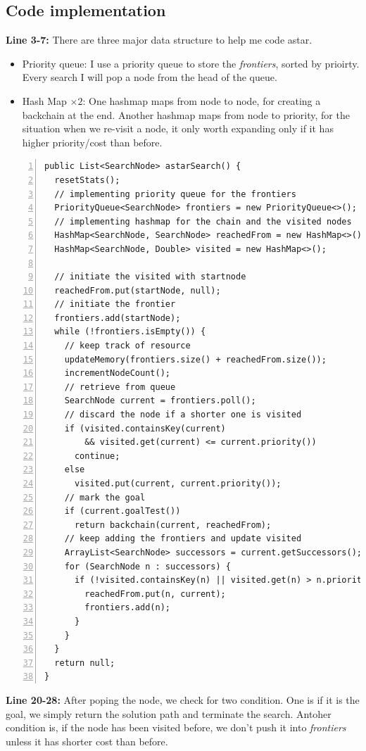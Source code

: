 \subsection{Code implementation}
\textbf{Line 3-7:} There are three major data structure to help me code astar.
\begin{itemize}
\item Priority queue: I use a priority queue to store the \emph{frontiers}, sorted by prioirty. Every search I will pop a node from the head of the queue.
\item Hash Map $\times 2$: One hashmap maps from node to node, for creating a backchain at the end. Another hashmap maps from node to priority, for the situation when we re-visit a node, it only worth expanding only if it has higher priority/cost than before.
\end{itemize}

\begin{lstlisting}[numbers=left]
public List<SearchNode> astarSearch() {
  resetStats();
  // implementing priority queue for the frontiers
  PriorityQueue<SearchNode> frontiers = new PriorityQueue<>();
  // implementing hashmap for the chain and the visited nodes
  HashMap<SearchNode, SearchNode> reachedFrom = new HashMap<>();
  HashMap<SearchNode, Double> visited = new HashMap<>();

  // initiate the visited with startnode
  reachedFrom.put(startNode, null);
  // initiate the frontier
  frontiers.add(startNode);
  while (!frontiers.isEmpty()) {
    // keep track of resource
    updateMemory(frontiers.size() + reachedFrom.size());
    incrementNodeCount();
    // retrieve from queue
    SearchNode current = frontiers.poll();
    // discard the node if a shorter one is visited
    if (visited.containsKey(current)
        && visited.get(current) <= current.priority())
      continue;
    else
      visited.put(current, current.priority());
    // mark the goal
    if (current.goalTest())
      return backchain(current, reachedFrom);
    // keep adding the frontiers and update visited
    ArrayList<SearchNode> successors = current.getSuccessors();
    for (SearchNode n : successors) {
      if (!visited.containsKey(n) || visited.get(n) > n.priority()) {
        reachedFrom.put(n, current);
        frontiers.add(n);
      }
    }
  }
  return null;
}
\end{lstlisting}

\textbf{Line 20-28:} After poping the node, we check for two condition. One is if it is the goal, we simply return the solution path and terminate the search. Antoher condition is, if the node has been visited before, we don't push it into \emph{frontiers} unless it has shorter cost than before.

